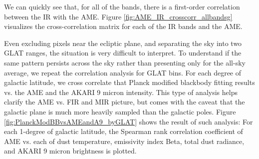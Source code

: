 \documentclass[preprint2,longabstract]{aastex}
\begin{document}
    We can quickly see that, for all of the bands, there is a first-order correlation between the IR with the AME. Figure \ref{fig:AME_IR_crosscorr_allbandsg} visualizes the cross-correlation matrix for each of the IR bands and the AME.
    
    Even excluding pixels near the ecliptic plane, and separating the sky into two GLAT ranges, the situation is very difficult to interpret. To understand if the same pattern persists across the sky rather than presenting only for the all-sky average, we repeat the correlation analysis for GLAT bins. For each degree of galactic latitude, we cross correlate that Planck modified blackbody fitting results vs. the AME and the AKARI 9 micron intensity. This type of analysis helps clarify the AME vs. FIR and MIR picture, but comes with the caveat that the galactic plane is much more heavily sampled than the galactic poles. Figure \ref{fig:PlanckModBBvsAMEandA9_byGLAT} shows the result of such analysis: For each 1-degree of galactic latitude, the Spearman rank correlation coefficient of AME vs. each of dust temperature, emissivity index Beta, total dust radiance, and AKARI 9 micron brightness is plotted.
   

    
\end{document}

